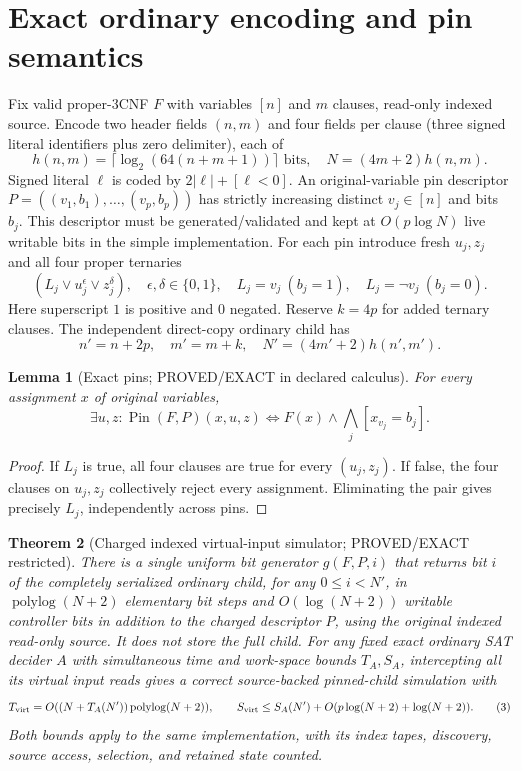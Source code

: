 \documentclass[11pt]{article}
\newtheorem{theorem}{Theorem}
\newtheorem{lemma}[theorem]{Lemma}
\begin{document}
\section{Exact ordinary encoding and pin semantics}
Fix valid proper-3CNF $F$ with variables $[n]$ and $m$ clauses, read-only indexed source. Encode two header fields $(n,m)$ and four fields per clause (three signed literal identifiers plus zero delimiter), each of
\[
h(n,m)=\lceil\log_2(64(n+m+1))\rceil\text{ bits},\quad N=(4m+2)h(n,m).
\]
Signed literal $\ell$ is coded by $2|\ell|+[\ell<0]$. An original-variable pin descriptor $P=((v_1,b_1),\dots,(v_p,b_p))$ has strictly increasing distinct $v_j\in[n]$ and bits $b_j$. This descriptor must be generated/validated and kept at $O(p\log N)$ live writable bits in the simple implementation.
For each pin introduce fresh $u_j,z_j$ and all four proper ternaries
\[
 (L_j\vee u_j^{\epsilon}\vee z_j^{\delta}),\quad
 \epsilon,\delta\in\{0,1\},\quad
 L_j=v_j\ (b_j=1),\quad L_j=\neg v_j\ (b_j=0).
\]
Here superscript $1$ is positive and $0$ negated. Reserve $k=4p$ for added ternary clauses. The independent direct-copy ordinary child has
\[
 n'=n+2p,\quad m'=m+k,\quad
 N'=(4m'+2)h(n',m').
 \tag{1}
\]
\begin{lemma}[Exact pins; PROVED/EXACT in declared calculus]
For every assignment $x$ of original variables,
\[
 \exists u,z:\operatorname{Pin}(F,P)(x,u,z)
 \Longleftrightarrow F(x)\land\bigwedge_j[x_{v_j}=b_j].
 \tag{2}
\]
\end{lemma}
\begin{proof}
If $L_j$ is true, all four clauses are true for every $(u_j,z_j)$. If false, the four clauses on $u_j,z_j$ collectively reject every assignment. Eliminating the pair gives precisely $L_j$, independently across pins.
\end{proof}
\begin{theorem}[Charged indexed virtual-input simulator; PROVED/EXACT restricted]
There is a single uniform bit generator $g(F,P,i)$ that returns bit $i$ of the completely serialized ordinary child, for any $0\le i<N'$, in $\operatorname{polylog}(N+2)$ elementary bit steps and $O(\log(N+2))$ writable controller bits \emph{in addition to the charged descriptor $P$}, using the original indexed read-only source. It does not store the full child.
For any fixed exact ordinary SAT decider $A$ with simultaneous time and work-space bounds $T_A,S_A$, intercepting all its virtual input reads gives a correct source-backed pinned-child simulation with
\[
 T_{\rm virt}=O((N+T_A(N'))\operatorname{polylog}(N+2)),\qquad
 S_{\rm virt}\le S_A(N')+O(p\log(N+2)+\log(N+2)).
 \tag{3}
\]
Both bounds apply to the same implementation, with its index tapes, discovery, source access, selection, and retained state counted.
\end{theorem}
\end{document}
